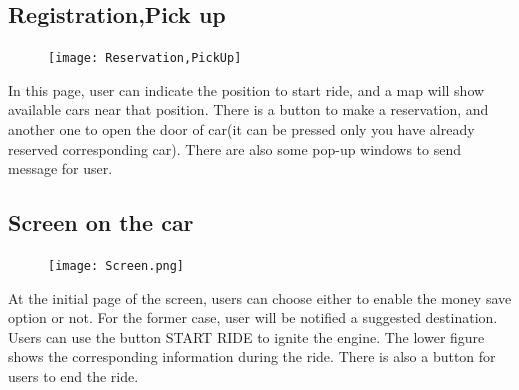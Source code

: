 \documentclass{article}
\begin{document}
	\subsection{Registration,Pick up}
	\begin{figure}[h]
		\texttt{[image: Reservation,PickUp]} 
	\end{figure}
	In this page, user can indicate the position to start ride, and a map will show available cars near that position. There is a button to make a reservation, and another one to open the door of car(it can be pressed only you have already reserved corresponding car). There are also some pop-up windows to send message for user. 
	\newpage
	\subsection{Screen on the car}
	\begin{figure}[h]
		\centering
		\texttt{[image: Screen.png]} 
	\end{figure}
	At the initial page of the screen, users can choose either to enable the money save option or not. For the former case, user will be notified a suggested destination. Users can use the button START RIDE to ignite the engine. The lower figure shows the corresponding information during the ride. There is also a button for users to end the ride.
	
	\newpage
\end{document}

